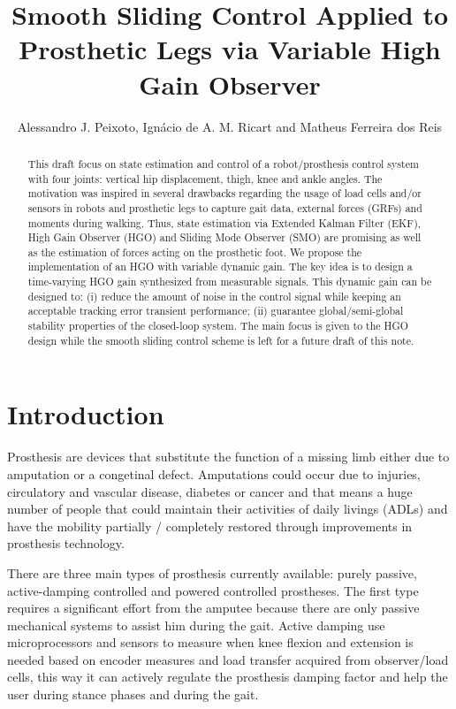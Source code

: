 \documentclass[letterpaper, 10 pt, journal, twocolumn]{IEEEtran}  %
\title{\LARGE \bf
Smooth Sliding Control Applied to Prosthetic Legs via Variable High Gain Observer}
\author{Alessandro J. Peixoto, %
        Ign\'{a}cio de A. M. Ricart and
        Matheus Ferreira dos Reis %
}
\theoremstyle{plain}
\theoremstyle{definition}
\theoremstyle{remark}
\begin{document}

\maketitle
\thispagestyle{empty}
\pagestyle{empty}
\begin{abstract}%
This draft focus on state estimation and control of a robot/prosthesis control system with four joints: vertical hip displacement, thigh, knee and ankle angles. The motivation was inspired in several drawbacks regarding the usage of load cells and/or sensors in robots and prosthetic legs to capture gait data, external forces (GRFs) and moments during walking. Thus, state estimation via Extended Kalman Filter (EKF), High Gain Observer (HGO) and Sliding Mode Observer (SMO) are promising as well as the estimation of forces acting on the prosthetic foot. We propose the implementation of an HGO with variable dynamic gain. The key idea is to design a time-varying HGO gain synthesized from measurable signals. This dynamic gain can be designed to: (i) reduce the amount of noise in the control signal while keeping an acceptable tracking error  transient performance; (ii) guarantee global/semi-global stability properties of the closed-loop system. The main focus is given to the HGO design while the smooth sliding control scheme is left for a future draft of this note. 
\end{abstract}
\section{Introduction}

Prosthesis are devices that substitute the function of a missing limb either due to amputation or a congetinal defect. Amputations could occur due to injuries, circulatory and vascular disease, diabetes or cancer \cite{CristianBook} and that means a huge number of people that could maintain their activities of daily livings (ADLs) and have the mobility partially / completely restored through improvements in prosthesis technology. 

There are three main types of prosthesis currently available: purely passive, active-damping controlled and powered controlled prostheses. The first type requires a significant effort from the amputee because there are only passive mechanical systems to assist him during the gait. Active damping use microprocessors and sensors to measure when knee flexion and extension is needed based on encoder measures and load transfer acquired from observer/load cells, this way it can actively regulate the prosthesis damping factor and help the user during stance phases and during the gait.
\end{document}
